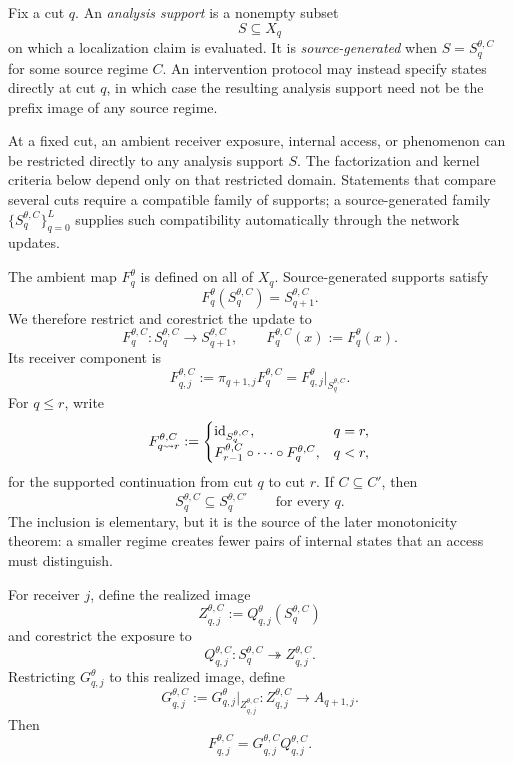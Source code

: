 \begin{definition}
\label{def:analysis-support}
Fix a cut $q$. An \emph{analysis support} is a nonempty subset
\[
S\subseteq X_q
\]
on which a localization claim is evaluated. It is \emph{source-generated} when $S=S_q^{\theta,C}$ for some source regime $C$. An intervention protocol may instead specify states directly at cut $q$, in which case the resulting analysis support need not be the prefix image of any source regime.
\end{definition}

At a fixed cut, an ambient receiver exposure, internal access, or phenomenon can be restricted directly to any analysis support $S$. The factorization and kernel criteria below depend only on that restricted domain. Statements that compare several cuts require a compatible family of supports; a source-generated family $\{S_q^{\theta,C}\}_{q=0}^L$ supplies such compatibility automatically through the network updates.

The ambient map $F_q^\theta$ is defined on all of $X_q$. Source-generated supports satisfy
\[
F_q^\theta(S_q^{\theta,C})=S_{q+1}^{\theta,C}.
\]
We therefore restrict and corestrict the update to
\[
F_q^{\theta,C}:
S_q^{\theta,C}\to S_{q+1}^{\theta,C},
\qquad
F_q^{\theta,C}(x):=F_q^\theta(x).
\]
Its receiver component is
\[
F_{q,j}^{\theta,C}
:=\pi_{q+1,j}F_q^{\theta,C}
=F_{q,j}^\theta|_{S_q^{\theta,C}}.
\]
For $q\le r$, write
\begin{equation}
F_{q\rightsquigarrow r}^{\theta,C}
:=
\begin{cases}
\operatorname{id}_{S_q^{\theta,C}}, & q=r,\\
F_{r-1}^{\theta,C}\circ\cdots\circ F_q^{\theta,C}, & q<r,
\end{cases}
\label{eq:supported-continuation}
\end{equation}
for the supported continuation from cut $q$ to cut $r$.
If $C\subseteq C'$, then
\begin{equation}
S_q^{\theta,C}\subseteq S_q^{\theta,C'}
\qquad\text{for every }q.
\label{eq:support-monotonicity-basic}
\end{equation}
The inclusion is elementary, but it is the source of the later monotonicity theorem: a smaller regime creates fewer pairs of internal states that an access must distinguish.

For receiver $j$, define the realized image
\[
Z_{q,j}^{\theta,C}:=
Q_{q,j}^\theta(S_q^{\theta,C})
\]
and corestrict the exposure to
\[
Q_{q,j}^{\theta,C}:
S_q^{\theta,C}\twoheadrightarrow Z_{q,j}^{\theta,C}.
\]
Restricting $G_{q,j}^\theta$ to this realized image, define
\[
G_{q,j}^{\theta,C}
:=
G_{q,j}^\theta\big|_{Z_{q,j}^{\theta,C}}
:
Z_{q,j}^{\theta,C}\to A_{q+1,j}.
\]
Then
\[
F_{q,j}^{\theta,C}
=
G_{q,j}^{\theta,C}Q_{q,j}^{\theta,C}.
\]

